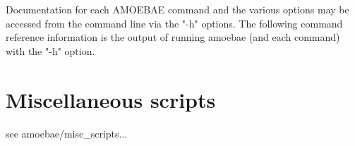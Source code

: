 \documentclass[12pt,letterpaper]{article}
\begin{document}
\begin{linenumbers}
%
%
%
%
%
%
%


Documentation for each AMOEBAE command and the various options may be accessed
from the command line via the "-h" options. The following command reference
information is the output of running amoebae (and each command) with the "-h"
option.




\section{Miscellaneous scripts}

see amoebae/misc\_scripts...



\printglossaries %

\newpage
\end{linenumbers}

 
\begin{multicols}{2}
{\footnotesize %
}
\end{multicols}
\end{document}
